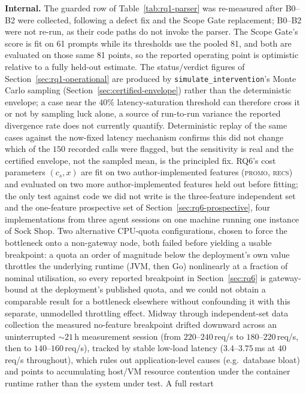 \documentclass[journal, 10pt]{IEEEtran}
\begin{document}
\textbf{Internal.} The guarded row of Table~\ref{tab:rq1-parser} was re-measured after
B0--B2 were collected, following a defect fix and the Scope Gate replacement;
B0--B2 were not re-run, as their code paths do not invoke the parser. The Scope
Gate's score is fit on 61 prompts while its thresholds use the pooled 81, and
both are evaluated on those same 81 points, so the reported operating point is
optimistic relative to a fully held-out estimate. The status/verdict figures of
Section~\ref{sec:rq1-operational} are produced by \texttt{simulate\_intervention}'s
Monte Carlo sampling (Section~\ref{sec:certified-envelope}) rather than the
deterministic envelope; a case near the $40\%$ latency-saturation threshold can
therefore cross it or not by sampling luck alone, a source of run-to-run
variance the reported divergence rate does not currently quantify. Deterministic
replay of the same cases against the now-fixed latency mechanism confirms this
did not change which of the $150$ recorded calls were flagged, but the
sensitivity is real and the certified envelope, not the sampled mean, is the
principled fix. RQ6's cost parameters $(c_s, x)$ are fit on two
author-implemented features (\textsc{promo}, \textsc{recs}) and evaluated on
two more author-implemented features held out before fitting; the only test
against code we did not write is the three-feature independent set and the
one-feature prospective set of Section~\ref{sec:rq6-prospective}, four
implementations from three agent sessions on one machine running one instance
of Sock Shop. Two alternative CPU-quota configurations, chosen to force the
bottleneck onto a non-gateway node, both failed before yielding a usable
breakpoint: a quota an order of magnitude below the deployment's own value
throttles the underlying runtime (JVM, then Go) nonlinearly at a fraction of
nominal utilisation, so every reported breakpoint in Section~\ref{sec:rq6} is
gateway-bound at the deployment's published quota, and we could not obtain a
comparable result for a bottleneck elsewhere without confounding it with this
separate, unmodelled throttling effect.
\label{sec:drift-threat}
Midway through independent-set data collection the measured no-feature
breakpoint drifted downward across an uninterrupted $\sim\!21\,$h measurement
session (from $220$--$240\,$req/s to $180$--$220\,$req/s, then to
$140$--$160\,$req/s), tracked by stable low-load latency ($3.4$--$3.75\,$ms at
$40\,$req/s throughout), which rules out application-level causes
(e.g.\ database bloat) and points to accumulating host/VM resource contention
under the container runtime rather than the system under test. A full restart
\end{document}
